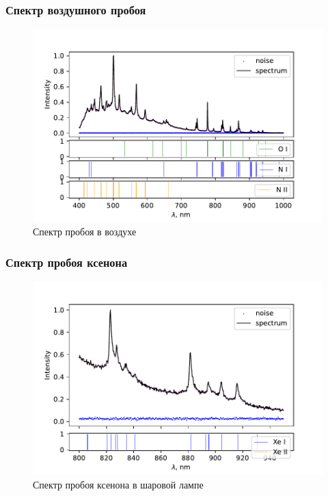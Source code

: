 \documentclass{beamer}
\begin{document}
	\begin{frame}
		\frametitle{Спектр воздушного пробоя}
		\begin{figure}
			\centering
			\includegraphics[width=\linewidth]{gen/air_lines.pdf}
			\caption*{Спектр пробоя в воздухе}
		\end{figure}
	\end{frame}
	
	\begin{frame}
		\frametitle{Спектр пробоя ксенона}
		\begin{figure}
			\centering
			\includegraphics[width=\linewidth]{gen/xe_lines_spherical.pdf}
			\caption*{Спектр пробоя ксенона в шаровой лампе}
		\end{figure}
	\end{frame}
	
\end{document}
